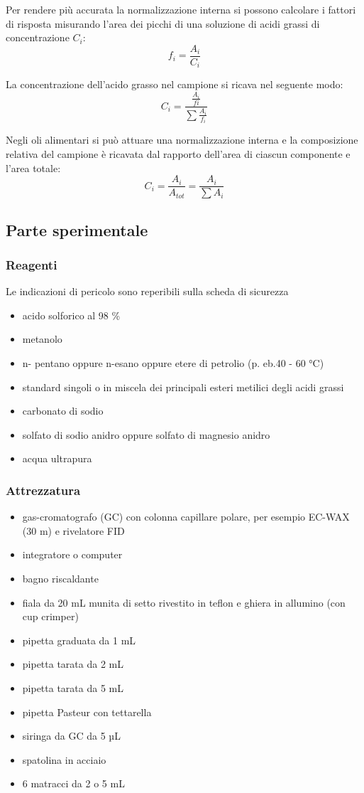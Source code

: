 Per rendere più accurata la normalizzazione interna si possono calcolare i fattori di risposta misurando l'area dei picchi di una soluzione di acidi grassi di concentrazione $C_i$:
\[
f_i = \frac{A_i}{C_i}
\]

La concentrazione dell'acido grasso nel campione si ricava nel seguente modo:
\[
C_i = \frac{\frac{A_i}{fi}}{\sum \frac{A_i}{f_i}}
\]

Negli oli alimentari si può attuare una normalizzazione interna e la composizione relativa del campione è ricavata dal rapporto dell'area di ciascun componente e l'area totale:
\[
C_i = \frac{A_i}{A_{tot}} = \frac{A_i}{\sum A_i}
\]

\subsection{Parte sperimentale}
\subsubsection{Reagenti}
Le indicazioni di pericolo sono reperibili sulla scheda di sicurezza
\begin{itemize}
\item acido solforico al 98 \%
\item metanolo
\item n- pentano oppure n-esano oppure etere di petrolio (p. eb.40 - 60 °C)
\item standard singoli o in miscela dei principali esteri metilici degli acidi grassi
\item carbonato di sodio
\item solfato di sodio anidro oppure solfato di magnesio anidro
\item acqua ultrapura
\end{itemize}

\subsubsection{Attrezzatura}
\begin{itemize}
\item gas-cromatografo (GC) con colonna capillare polare, per esempio EC-WAX (30 m) e rivelatore FID
\item integratore o computer
\item bagno riscaldante
\item fiala da 20 mL munita di setto rivestito in teflon e ghiera in allumino (con cup crimper)
\item pipetta graduata da 1 mL
\item pipetta tarata da 2 mL
\item pipetta tarata da 5 mL
\item pipetta Pasteur con tettarella
\item siringa da GC da 5 µL
\item spatolina in acciaio
\item 6 matracci da 2 o 5 mL
\end{itemize}

